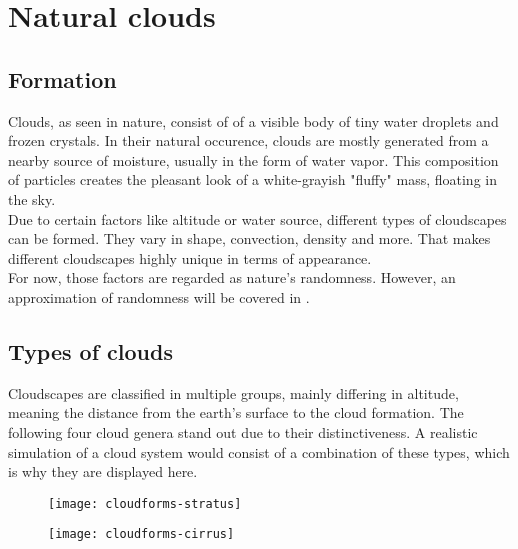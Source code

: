 \section{Natural clouds}

\subsection{Formation}
Clouds, as seen in nature, consist of of a visible body of tiny water droplets and frozen crystals. 
In their natural occurence, clouds are mostly generated from a nearby source of moisture, usually in the form of water vapor. 
This composition of particles creates the pleasant look of a white-grayish "fluffy" mass, floating in the sky.
\\
Due to certain factors like altitude or water source, different types of cloudscapes can be formed. They vary in shape, \gls{convection}, density and more.
That makes different cloudscapes highly unique in terms of appearance.
\\
For now, those factors are regarded as nature's randomness. However, an approximation of randomness will be covered in .


\subsection{Types of clouds}
\label{section:cloud-types}
Cloudscapes are classified in multiple groups, mainly differing in altitude, meaning the distance from the earth's surface to the cloud formation.
The following four cloud genera stand out due to their distinctiveness. A realistic simulation of a cloud system would consist of a combination of these types, which is why they are displayed here.
\begin{figure}[ht]
    \centering
        \begin{minipage}{0.47\linewidth}
            \texttt{[image: cloudforms-stratus]}
            \label{img:photo:cloudforms-stratus}        
        \end{minipage}        
    \hfill
        \begin{minipage}{0.47\linewidth}
            \texttt{[image: cloudforms-cirrus]}
            \label{img:photo:cloudforms-cirrus}        
        \end{minipage}
\end{figure}


